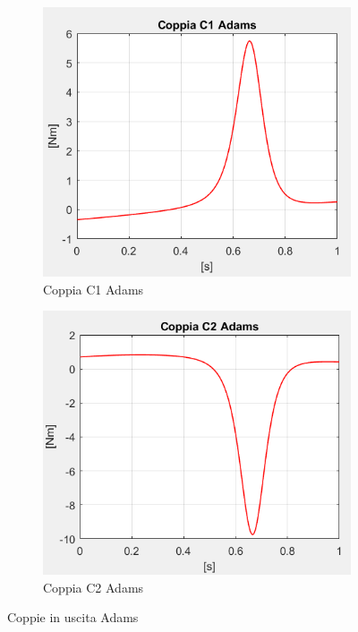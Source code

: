 \begin{figure}[!ht]
	\begin{subfigure}{.5\textwidth}
		\centering
		\includegraphics[width=.9\linewidth]{Immagini/Dinamica/c1adams.png}  
		\caption{Coppia C1 Adams}
		\label{fig:leggiC1A}
	\end{subfigure}
	\begin{subfigure}{.5\textwidth}
		\centering
		\includegraphics[width=.9\linewidth]{Immagini/Dinamica/c2adams.png}  
		\caption{Coppia C2 Adams}
		\label{fig:leggiC2A}
	\end{subfigure}
	\caption{Coppie in uscita Adams}
\end{figure}
